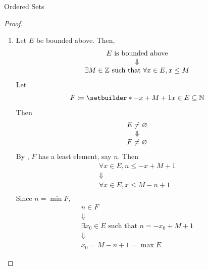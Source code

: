 \begin{section}{Ordered Sets}
\begin{proof}
\begin{enumerate}[label=\textbf{(\Alph*)}]
\[        \]
        \item Let $E$ be bounded above. Then,
        \[
        \begin{array}{c}
            E \text{ is bounded above} \\
            \Downarrow \\
            \exists M \in \mathbb{Z} \text{ such that } \forall x \in E, x \leq M
        \end{array}
        \]
        Let
        \[
        F \coloneqq \setbuilder*{-x + M + 1}{x \in E} \subseteq \N
        \]
        Then
        \[
        \begin{array}{c}
            E \neq \varnothing \\
            \Downarrow \\
            F \neq \varnothing
        \end{array}
        \]
        By , $F$ has a least element, say $n$. Then
        \[
        \begin{array}{c}
            \forall x \in E, n \leq - x + M + 1 \\
            \Downarrow \\
            \forall x \in E, x \leq M - n + 1 \\
        \end{array}
        \]
        Since $n = \min F$,
        \[
        \begin{array}{c}
            n \in F \\
            \Downarrow \\
            \exists x_{0} \in E \text{ such that } n = -x_{0} + M + 1 \\
            \Downarrow \\
            x_{0} = M - n + 1 = \max E
        \end{array}
        \]
    \end{enumerate}
\end{proof}

\bigskip


\end{section}
